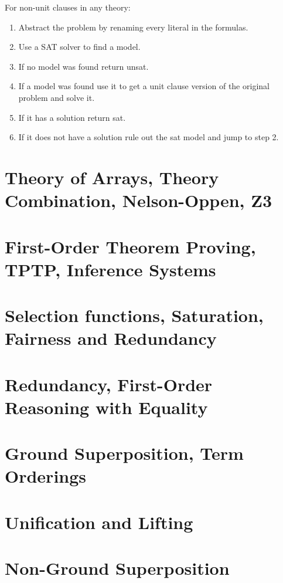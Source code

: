 \documentclass[]{article}
\begin{document}
For non-unit clauses in any theory:
\begin{enumerate}
	\item Abstract the problem by renaming every literal in the formulas.
	\item Use a SAT solver to find a model.
	\item If no model was found return unsat.
	\item If a model was found use it to get a unit clause version of the original problem and solve it.
	\item If it has a solution return sat.
	\item If it does not have a solution rule out the sat model and jump to step 2.
\end{enumerate}

\section{Theory of Arrays, Theory Combination, Nelson-Oppen, Z3}

\section{First-Order Theorem Proving, TPTP, Inference Systems}

\section{Selection functions, Saturation, Fairness and Redundancy}

\section{Redundancy, First-Order Reasoning with Equality}

\section{Ground Superposition, Term Orderings}

\section{Unification and Lifting}

\section{Non-Ground Superposition}
\end{document}
